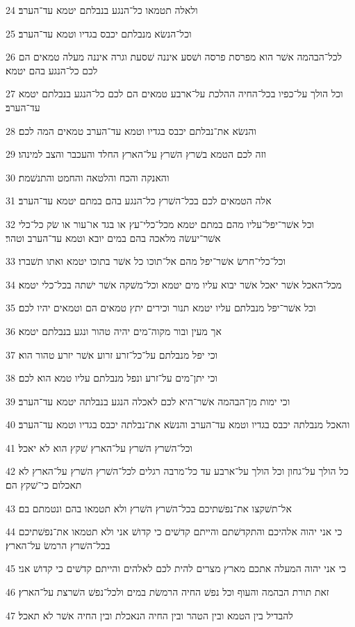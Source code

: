 \par 24 ולאלה תטמאו כל־הנגע בנבלתם יטמא עד־הערב׃
\par 25 וכל־הנשׂא מנבלתם יכבס בגדיו וטמא עד־הערב׃
\par 26 לכל־הבהמה אשׁר הוא מפרסת פרסה ושׁסע איננה שׁסעת וגרה איננה מעלה טמאים הם לכם כל־הנגע בהם יטמא׃
\par 27 וכל הולך על־כפיו בכל־החיה ההלכת על־ארבע טמאים הם לכם כל־הנגע בנבלתם יטמא עד־הערב׃
\par 28 והנשׂא את־נבלתם יכבס בגדיו וטמא עד־הערב טמאים המה לכם׃
\par 29 וזה לכם הטמא בשׁרץ השׁרץ על־הארץ החלד והעכבר והצב למינהו׃
\par 30 והאנקה והכח והלטאה והחמט והתנשׁמת׃
\par 31 אלה הטמאים לכם בכל־השׁרץ כל־הנגע בהם במתם יטמא עד־הערב׃
\par 32 וכל אשׁר־יפל־עליו מהם במתם יטמא מכל־כלי־עץ או בגד או־עור או שׂק כל־כלי אשׁר־יעשׂה מלאכה בהם במים יובא וטמא עד־הערב וטהר׃
\par 33 וכל־כלי־חרשׂ אשׁר־יפל מהם אל־תוכו כל אשׁר בתוכו יטמא ואתו תשׁברו׃
\par 34 מכל־האכל אשׁר יאכל אשׁר יבוא עליו מים יטמא וכל־משׁקה אשׁר ישׁתה בכל־כלי יטמא׃
\par 35 וכל אשׁר־יפל מנבלתם עליו יטמא תנור וכירים יתץ טמאים הם וטמאים יהיו לכם׃
\par 36 אך מעין ובור מקוה־מים יהיה טהור ונגע בנבלתם יטמא׃
\par 37 וכי יפל מנבלתם על־כל־זרע זרוע אשׁר יזרע טהור הוא׃
\par 38 וכי יתן־מים על־זרע ונפל מנבלתם עליו טמא הוא לכם׃
\par 39 וכי ימות מן־הבהמה אשׁר־היא לכם לאכלה הנגע בנבלתה יטמא עד־הערב׃
\par 40 והאכל מנבלתה יכבס בגדיו וטמא עד־הערב והנשׂא את־נבלתה יכבס בגדיו וטמא עד־הערב׃
\par 41 וכל־השׁרץ השׁרץ על־הארץ שׁקץ הוא לא יאכל׃
\par 42 כל הולך על־גחון וכל הולך על־ארבע עד כל־מרבה רגלים לכל־השׁרץ השׁרץ על־הארץ לא תאכלום כי־שׁקץ הם׃
\par 43 אל־תשׁקצו את־נפשׁתיכם בכל־השׁרץ השׁרץ ולא תטמאו בהם ונטמתם בם׃
\par 44 כי אני יהוה אלהיכם והתקדשׁתם והייתם קדשׁים כי קדושׁ אני ולא תטמאו את־נפשׁתיכם בכל־השׁרץ הרמשׂ על־הארץ׃
\par 45 כי אני יהוה המעלה אתכם מארץ מצרים להית לכם לאלהים והייתם קדשׁים כי קדושׁ אני׃
\par 46 זאת תורת הבהמה והעוף וכל נפשׁ החיה הרמשׂת במים ולכל־נפשׁ השׁרצת על־הארץ׃
\par 47 להבדיל בין הטמא ובין הטהר ובין החיה הנאכלת ובין החיה אשׁר לא תאכל׃

